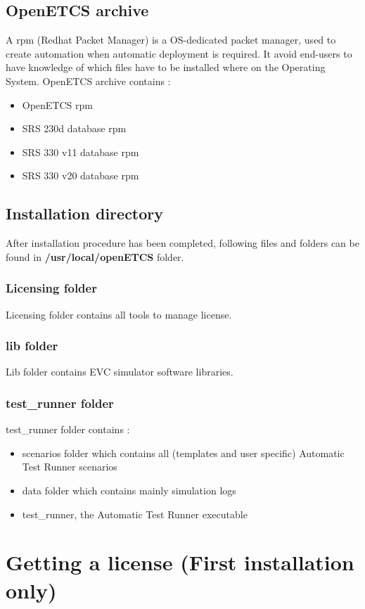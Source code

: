 \documentclass{template/openetcs_article}
\begin{document}
\subsection{OpenETCS archive}
A rpm (Redhat Packet Manager) is a OS-dedicated packet manager, used to create  automation when automatic deployment is required. It avoid end-users to have knowledge of which files have to be installed where on the Operating System. OpenETCS archive contains :
\begin{itemize}
	\item OpenETCS rpm
	\item SRS 230d database rpm
	\item SRS 330 v11 database rpm
	\item SRS 330 v20 database rpm
\end{itemize}
\subsection{Installation directory}
After installation procedure has been completed, following files and folders can be found in \textbf{/usr/local/openETCS} folder.
\subsubsection{Licensing folder}
Licensing folder contains all tools to manage license.
\subsubsection{lib folder}
Lib folder contains EVC simulator software libraries.
\subsubsection{test\_runner folder}
test\_runner folder contains :
\begin{itemize}
	\item scenarios folder which contains all (templates and user specific) Automatic Test Runner scenarios
	\item data folder which contains mainly simulation logs
	\item test\_runner, the Automatic Test Runner executable
\end{itemize}
\newpage
\section{Getting a license (First installation only)}
\end{document}
